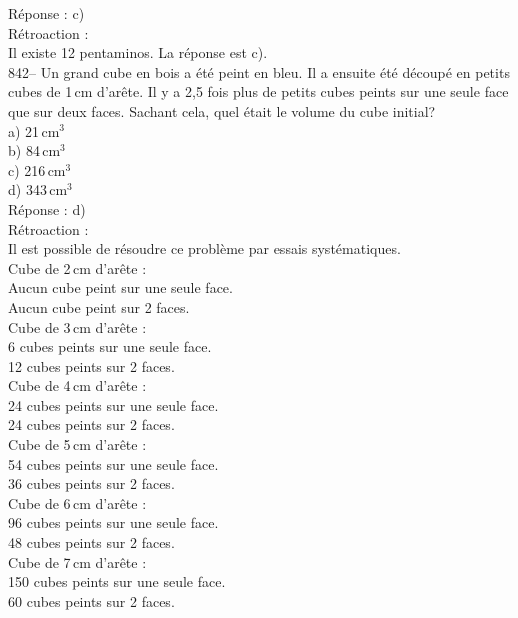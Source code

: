 ﻿\documentclass[letterpaper, 12pt]{article}
\begin{document}
R\'eponse : c)\\

R\'etroaction : \\
Il existe 12 pentaminos.  La r\'eponse est c).\\

842-- Un grand cube en bois a \'et\'e peint en bleu.  Il a ensuite \'et\'e
d\'ecoup\'e en petits cubes de 1\,cm d'ar\^ete.  Il y a 2,5 fois plus de
petits cubes peints sur une seule face que sur deux faces.  Sachant cela,
quel \'etait le volume du cube initial?\\
a) 21\,cm$^{3}$\\
b) 84\,cm$^{3}$\\
c) 216\,cm$^{3}$\\
d) 343\,cm$^{3}$\\

R\'eponse : d)\\

R\'etroaction : \\
Il est possible de r\'esoudre ce probl\`eme par essais syst\'ematiques.  \\
Cube de 2\,cm d'ar\^ete :\\
Aucun cube peint sur une seule face.\\
Aucun cube peint sur 2 faces.\\

Cube de 3\,cm d'ar\^ete :\\
6 cubes peints sur une seule face.\\
12 cubes peints sur 2 faces.\\

Cube de 4\,cm d'ar\^ete :\\
24 cubes peints sur une seule face.\\
24 cubes peints sur 2 faces.\\

Cube de 5\,cm d'ar\^ete :\\
54 cubes peints sur une seule face.\\
36 cubes peints sur 2 faces.\\

Cube de 6\,cm d'ar\^ete :\\
96 cubes peints sur une seule face.\\
48 cubes peints sur 2 faces.\\

Cube de 7\,cm d'ar\^ete :\\
150 cubes peints sur une seule face.\\
60 cubes peints sur 2 faces.\\
\end{document}
